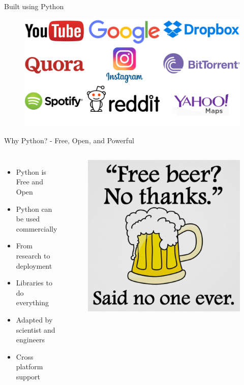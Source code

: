 \documentclass[10pt]{beamer}
\begin{document}
\begin{frame}{Built using Python}
\begin{figure}
\includegraphics[width=1.0\textwidth]{figs/logos.png}
\end{figure}
\end{frame}

\begin{frame}{Why Python? - Free, Open, and Powerful}
  \begin{columns}[onlytextwidth]
\begin{itemize}
\item Python is Free and Open
\item Python can be used commercially 
\item From research to deployment
\item Libraries to do everything
\item Adapted by scientist and engineers
\item Cross platform support
\end{itemize}
          \begin{figure} 	
 	\includegraphics[width=1.0\textwidth]{figs/free-beer.jpg}
      \end{figure}
  \end{columns}
\end{frame}
\end{document}

